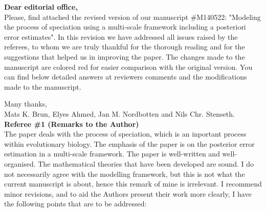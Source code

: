 \documentclass[a4paper,11pt]{scrartcl}
\date{}%
\begin{document}
\textbf{Dear editorial office,}\\

Please, find attached the revised version of our manuscript \#M140522: "Modeling the process of speciation using a multi-scale framework including a posteriori error estimates". In this revision we have addressed all issues raised by the referees, to whom we are truly thankful for the thorough reading and for the suggestions that helped us in improving the paper. The changes made to the manuscript are colored red for easier comparison with the original version. You can find below detailed answers at reviewers comments and the modifications made to the manuscript.

Many thanks,\\
\hspace*{2cm}Mats K. Brun, Elyes Ahmed, Jan M. Nordbotten and Nils Chr. Stenseth.\\[2ex]

\textbf{ Referee \#1  (Remarks to the Author)}\\

The paper deals with the process of speciation, which is an inportant process within evolutionary biology. The emphasis of the paper is on the posterior error estimation in a multi-scale framework. The paper is well-written and well-organised. The mathematical theories that have been developed are sound. I do not necessarily agree with the modelling framework, but this is not what the current manuscript is about, hence this remark of mine is irrelevant. I recommend minor revisions, and to aid the Authors present their work more clearly, I have the following points that are to be addressed:
\end{document}
